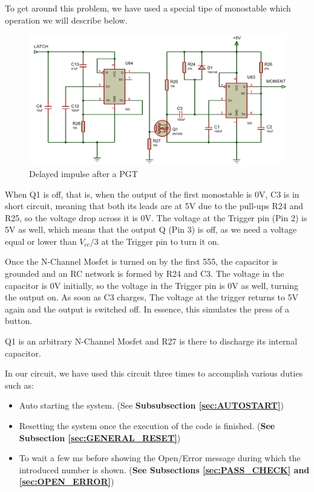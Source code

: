 To get around this problem, we have used a special tipe of monostable which operation we will describe below.\medskip

\begin{figure}[H]
    \centering
    \includegraphics[scale = 0.7]{Graphics/DELAY/DELAY_PULSE.PDF}
    \caption{Delayed impulse after a PGT}
    \label{fig:DELAY_IMPULSE}
\end{figure}


When Q1 is off, that is, when the output of the first monostable is 0V, C3 is in short circuit, meaning that both its leads are at 5V due to the pull-ups R24 and R25, so the voltage drop across it is 0V. The voltage at the Trigger pin (Pin 2) is 5V as well, which means that the output Q (Pin 3) is off, as we need a voltage equal or lower than $V_{cc}/3$ at the Trigger pin to turn it on.\medskip

Once the N-Channel Mosfet is turned on by the first 555, the capacitor is grounded and an RC network is formed by R24 and C3. The voltage in the capacitor is 0V initially, so the voltage in the Trigger pin is 0V as well, turning the output on. As soon as C3 charges, The voltage at the trigger returns to 5V again and the output is switched off. In essence, this simulates the press of a button. \medskip

Q1 is an arbitrary N-Channel Mosfet and R27 is there to discharge its internal capacitor. \medskip

In our circuit, we have used this circuit three times to accomplish various duties such as:

\begin{itemize}
    \item Auto starting the system. (See \textbf{Subsubsection \ref{sec:AUTOSTART}})
    \item Resetting the system once the execution of the code is finished. (\textbf{See Subsection \ref{sec:GENERAL_RESET}})
    \item To wait a few ms before showing the Open/Error message during which the introduced number is shown. (\textbf{See Subsections \ref{sec:PASS_CHECK} and \ref{sec:OPEN_ERROR}})
\end{itemize}